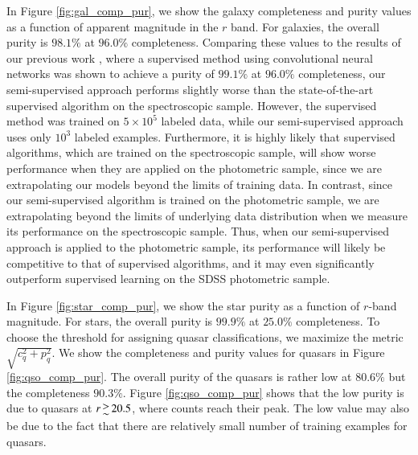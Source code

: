 \documentclass[fleqn,usenatbib]{mnras}
\begin{document}
In Figure \ref{fig:gal_comp_pur}, we show the galaxy completeness and purity values as a function of apparent magnitude
in the $r$ band.
For galaxies, the overall purity is $98.1\%$ at $96.0\%$ completeness.
Comparing these values to the results of our previous work \citep{kim2017star},
where a supervised method using convolutional neural networks
was shown to achieve a purity of $99.1\%$ at $96.0\%$ completeness,
our semi-supervised approach performs slightly worse than the state-of-the-art supervised algorithm on the spectroscopic sample.
However, the supervised method was trained on $5 \times 10^5$ labeled data,
while our semi-supervised approach uses only $10^3$ labeled examples.
Furthermore, it is highly likely that supervised algorithms, which are
trained on the spectroscopic sample, will show worse performance when they are applied on the photometric sample,
since we are extrapolating our models beyond the limits of training data.
In contrast, since our semi-supervised algorithm is trained on the photometric sample, we are
extrapolating beyond the limits of underlying data distribution when we measure its performance on
the spectroscopic sample.
Thus, when our semi-supervised approach is applied to the photometric sample, its performance will likely be
competitive to that of supervised algorithms, and it may even significantly outperform supervised learning
on the SDSS photometric sample.

In Figure \ref{fig:star_comp_pur}, we show the star purity as a function of $r$-band magnitude.
For stars, the overall purity is $99.9\%$ at $25.0\%$ completeness.
To choose the threshold for assigning quasar classifications, we maximize the metric $\sqrt{ c_q^2 + p_q^2 }$.
We show the completeness and purity values for quasars in Figure \ref{fig:qso_comp_pur}.
The overall purity of the quasars is rather low at $80.6\%$ but the completeness $90.3\%$.
Figure \ref{fig:qso_comp_pur} shows that the low purity is due to quasars at $r \ga 20.5$,
where counts reach their peak.
The low value may also be due to the fact that there are relatively small number of training examples for quasars.
\end{document}
